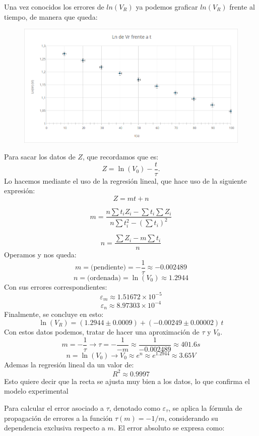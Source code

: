 \documentclass{article}
\begin{document}
Una vez conocidos los errores de $ln(V_R)$ ya podemos graficar $ln(V_R)$ frente al tiempo, de manera que queda:
 \begin{figure}[H]
 	\centering
 	\includegraphics[width=1\linewidth]{images/graficaLnVr.png}

 \end{figure}
 
\vspace{4em}

Para sacar los datos de $Z$, que recordamos que es:
\[
Z = \ln(V_0) - \frac{t}{\tau}.
\]
Lo hacemos mediante el uso de la regresión lineal, que hace uso de la siguiente expresión:
\[
Z = mt + n
\]

\[
m = \frac{n \sum t_i Z_i - \sum t_i \sum Z_i}{n \sum t_i^2 - \left(\sum t_i\right)^2}
\]

\[
n = \frac{\sum Z_i - m \sum t_i}{n}
\]
Operamos y nos queda:
\[
m = \text{(pendiente)} = -\frac{1}{\tau} \approx -0.002489
\]
\[
n = \text{(ordenada)} = \ln(V_0) \approx 1.2944
\]
Con sus errores correspondientes:
\[
\varepsilon_m \approx 1.51672 \times 10^{-5}
\]
\[
\varepsilon_n \approx 8.97303 \times 10^{-4}
\]
Finalmente, se concluye en esto:
\[
\ln(V_R) = (1.2944 \pm 0.0009) + (-0.00249 \pm 0.00002)\, t
\]
Con estos datos podemos, tratar de hacer una aproximación de $\tau$ y $V_0$.
\[
m = -\frac{1}{\tau} \longrightarrow \tau = -\frac{1}{-m} \approx \frac{1}{-0.002489} \approx 401.6 s
\]
\[
n = \ln(V_0) \longrightarrow V_0 \approx e^{n} \approx e^{1.2944} \approx 3.65 V
\]
Ademas la regresión lineal da un valor de:
\[
R^2 \approx 0.9997
\]
Esto quiere decir que la recta se ajusta muy bien a los datos, lo que confirma el modelo experimental

\vspace{3em}


Para calcular el error asociado a \( \tau \), denotado como \( \varepsilon_\tau \), se aplica la fórmula de propagación de errores a la función \( \tau(m) = -1/m \), considerando su dependencia exclusiva respecto a \( m \). El error absoluto se expresa como:
\end{document}
